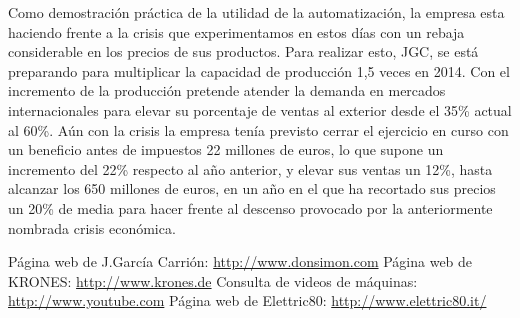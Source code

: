 \documentclass[11pt,a4paper,spanish,twoside]{report}
\begin{document}
Como demostración práctica de la utilidad de la automatización, la empresa
esta haciendo frente a la crisis que experimentamos en estos días con un
rebaja considerable en los precios de sus productos. Para realizar esto, JGC,
se está preparando para multiplicar la capacidad de producción 1,5 veces en
2014. Con el incremento de la producción pretende atender la demanda en
mercados internacionales para elevar su porcentaje de ventas al exterior
desde el 35\% actual al 60\%. Aún con la crisis la empresa tenía previsto
cerrar el ejercicio en curso con un beneficio antes de impuestos 22 millones
de euros, lo que supone un incremento del 22\% respecto al año anterior, y
elevar sus ventas un 12\%, hasta alcanzar los 650 millones de euros, en un
año en el que ha recortado sus precios un 20\% de media para hacer frente al
descenso provocado por la anteriormente nombrada crisis económica.
\begin{thebibliography}{99}
 Página web de J.García Carrión: \url{http://www.donsimon.com}
 Página web de KRONES: \url{http://www.krones.de}
 Consulta de videos de máquinas:
  \url{http://www.youtube.com}
 Página web de Elettric80:  \url{http://www.elettric80.it/}
\end{thebibliography}
% 
%
\end{document}

